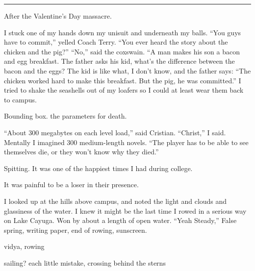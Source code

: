 \fancybreak{***}

After the Valentine's Day massacre.

I stuck one of my hands down my unisuit and underneath my balls.  ``You guys
have to commit,'' yelled Coach Terry.  ``You ever heard the story about the
chicken and the pig?'' ``No,'' said the coxswain.  ``A man makes his son a bacon
and egg breakfast.  The father asks his kid, what's the difference between the
bacon and the eggs?  The kid is like what, I don't know, and the father says:
``The chicken worked hard to make this breakfast.  But the pig, he was
committed.'' I tried to shake the seashells out of my loafers so I could at
least wear them back to campus. 

Bounding box.  the parameters for death.

``About 300 megabytes on each level load,'' said Cristian.  ``Christ,'' I said.
Mentally I imagined 300 medium-length novels.  ``The player has to be able to
see themselves die, or they won't know why they died.'' 

	Spitting.  It was one of the happiest times I had during college.
	

It was painful to be a loser in their presence.  

I looked up at the hills above campus, and noted the light and clouds and
glassiness of the water.  I knew it might be the last time I rowed in a serious
way on Lake Cayuga.  Won by about a length of open water.  ``Yeah Steady,'' False
spring, writing paper, end of rowing, sunscreen.

vidya, rowing

sailing?  each little mistake, crossing behind the sterns
